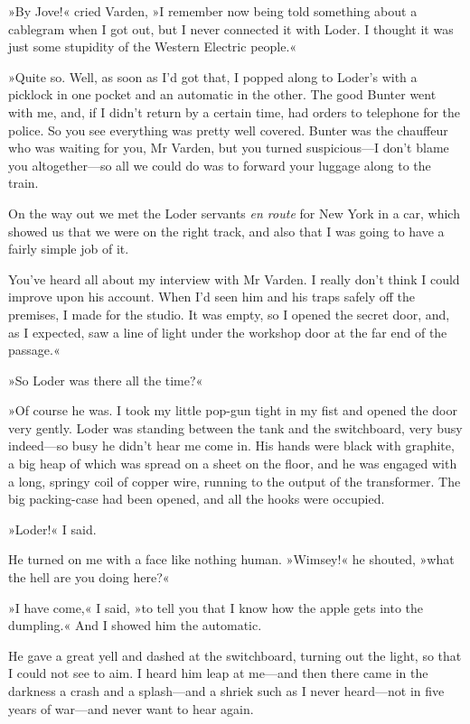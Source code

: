 »By Jove!« cried Varden, »I remember now being told something about a cablegram when I got out, but I never connected it with Loder. I thought it was just some stupidity of the Western Electric people.«

»Quite so. Well, as soon as I'd got that, I popped along to Loder's with a picklock in one pocket and an automatic in the other. The good Bunter went with me, and, if I didn't return by a certain time, had orders to telephone for the police. So you see everything was pretty well covered. Bunter was the chauffeur who was waiting for you, Mr Varden, but you turned suspicious—I don't blame you altogether—so all we could do was to forward your luggage along to the train.

On the way out we met the Loder servants \textit{en route} for New York in a car, which showed us that we were on the right track, and also that I was going to have a fairly simple job of it.

You've heard all about my interview with Mr Varden. I really don't think I could improve upon his account. When I'd seen him and his traps safely off the premises, I made for the studio. It was empty, so I opened the secret door, and, as I expected, saw a line of light under the workshop door at the far end of the passage.«

»So Loder was there all the time?«

»Of course he was. I took my little pop-gun tight in my fist and opened the door very gently. Loder was standing between the tank and the switchboard, very busy indeed—so busy he didn't hear me come in. His hands were black with graphite, a big heap of which was spread on a sheet on the floor, and he was engaged with a long, springy coil of copper wire, running to the output of the transformer. The big packing-case had been opened, and all the hooks were occupied.

»Loder!« I said.

He turned on me with a face like nothing human. »Wimsey!« he shouted, »what the hell are you doing here?«

»I have come,« I said, »to tell you that I know how the apple gets into the dumpling.« And I showed him the automatic.

He gave a great yell and dashed at the switchboard, turning out the light, so that I could not see to aim. I heard him leap at me—and then there came in the darkness a crash and a splash—and a shriek such as I never heard—not in five years of war—and never want to hear again.


